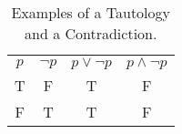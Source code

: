 \documentclass{Axon}
\begin{document}
\begin{table}[h]
    \centering
    \begin{tabular}{c|c|c|c}
        \(p\) & \(\lnot p\) & \(p \lor \lnot p\) & \(p \land \lnot p\) \\
        T     & F           & T                  & F                   \\
        F     & T           & T                  & F                  
    \end{tabular}
    \caption{Examples of a Tautology and a Contradiction.}
    \label{Table: 1}
\end{table}

\printbibliography
\end{document}

